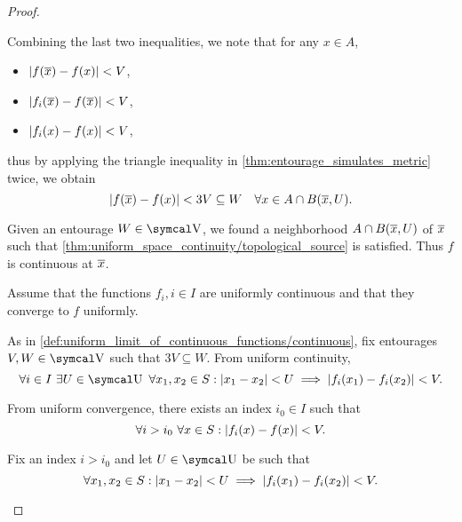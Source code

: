 \begin{proof}
\begin{description}
\begin{description}
      Combining the last two inequalities, we note that for any \( x \in A \),
      \begin{itemize}
        \item \( \left\vert f(\overline{x}) - f(x) \right\vert < V \),
        \item \( \left\vert f_i(\overline{x}) - f(\overline{x}) \right\vert < V \),
        \item \( \left\vert f_i(x) - f(x) \right\vert < V \),
      \end{itemize}
      thus by applying the triangle inequality in \cref{thm:entourage_simulates_metric} twice, we obtain
      \begin{equation*}
        \left\vert f(\overline{x}) - f(x) \right\vert < 3V \subseteq W \quad\forall x \in A \cap B(\overline{x}, U).
      \end{equation*}

      Given an entourage \( W \in \CV \), we found a neighborhood \( A \cap B(\overline{x}, U) \) of \( \overline{x} \) such that \cref{thm:uniform_space_continuity/topological_source} is satisfied. Thus \( f \) is continuous at \( \overline{x} \).

       Assume that the functions \( f_i, i \in I \) are uniformly continuous and that they converge to \( f \) uniformly.

      As in \cref{def:uniform_limit_of_continuous_functions/continuous}, fix entourages \( V, W \in \CV \) such that \( 3V \subseteq W \). From uniform continuity,
      \begin{equation*}
        \forall i \in I \ \exists U \in \CU \ \forall x_1, x_2 \in S : \Abs{x_1 - x_2} < U \implies \Abs{f_i(x_1) - f_i(x_2)} < V.
      \end{equation*}

      From uniform convergence, there exists an index \( i_0 \in I \) such that
      \begin{equation*}
        \forall i > i_0 \ \forall x \in S : \left\vert f_i(x) - f(x) \right\vert < V.
      \end{equation*}

      Fix an index \( i > i_0 \) and let \( U \in \CU \) be such that
      \begin{equation}\label{def:uniform_limit_of_continuous_functions/uniform/continuity}
        \forall x_1, x_2 \in S : \left\vert x_1 - x_2 \right\vert < U \implies \left\vert f_i(x_1) - f_i(x_2) \right\vert < V.
      \end{equation}


\end{description}
\end{description}
\end{proof}
